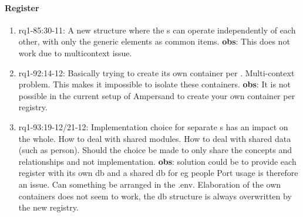 \paragraph{Register}
\begin{enumerate}
    \item rq1-85:30-11: A new structure where the s can operate independently of each other, with only the generic elements as common items.
    \newline\textbf{obs}: This does not work due to multicontext issue.

    \item rq1-92:14-12: Basically trying to create its own container per .
    Multi-context problem.
    This makes it impossible to isolate these containers.
    \newline\textbf{obs}: It is not possible in the current setup of Ampersand to create your own container per registry.
    
    \item rq1-93:19-12/21-12: Implementation choice for separate s has an impact on the whole.
    How to deal with shared modules.
    How to deal with shared data (such as person).
    Should the choice be made to only share the concepts and relationships and not implementation.
    \newline\textbf{obs}: solution could be to provide each register with its own db and a shared db for eg people
    Port usage is therefore an issue.
    Can something be arranged in the .env.
    Elaboration of the own containers does not seem to work, the db structure is always overwritten by the new registry.

\end{enumerate}

